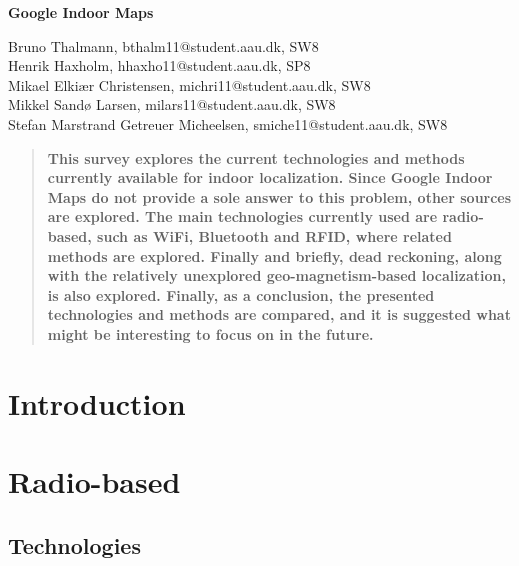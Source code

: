 \documentclass[12pt,a4paper]{article}
\begin{document}
\begin{center}
\bigskip\bigskip
{\Large\bf Google Indoor Maps}
\bigskip\bigskip


Bruno Thalmann, bthalm11@student.aau.dk, SW8\\
Henrik Haxholm, hhaxho11@student.aau.dk, SP8\\
Mikael Elkiær Christensen, michri11@student.aau.dk, SW8\\
Mikkel Sandø Larsen, milars11@student.aau.dk, SW8\\
Stefan Marstrand Getreuer Micheelsen, smiche11@student.aau.dk, SW8

\bigskip
\begin{abstract}
\textbf{This survey explores the current technologies and methods currently available for indoor localization.
Since Google Indoor Maps do not provide a sole answer to this problem, other sources are explored.
The main technologies currently used are radio-based, such as WiFi, Bluetooth and RFID, where related methods are explored.
Finally and briefly, dead reckoning, along with the relatively unexplored geo-magnetism-based localization, is also explored.
Finally, as a conclusion, the presented technologies and methods are compared, and it is suggested what might be interesting to focus on in the future.}
\end{abstract}

\thispagestyle{empty}
\end{center}


\titlepage



\thispagestyle{plain}


\section{Introduction}


\section{Radio-based}

\subsection{Technologies}




\end{document}
